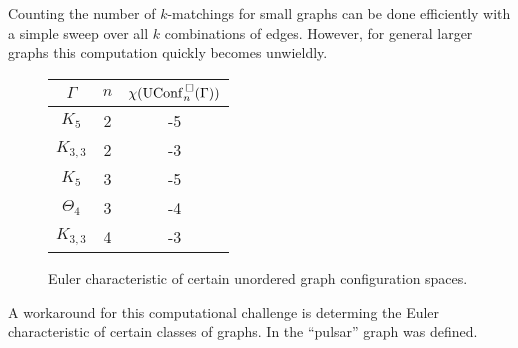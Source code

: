 Counting the number of \(k\)-matchings for small graphs can be done efficiently 
with a simple sweep over all \(k\) combinations of edges.
However, for general larger graphs this computation quickly becomes unwieldly.


\begin{figure}[h!]
\centering
\begin{tabular}{c | c | c}
   \(\Gamma\) & \(n\) & \(\chi(\mathrm{UConf}^{\,\square}_n(\Gamma))\) \\
   \hline
   \(K_5\) & 2 & -5 \\
   \(K_{3,3}\) & 2 & -3 \\
   \(K_5\) & 3 & -5 \\
   \(\Theta_4\) & 3 & -4 \\
   \(K_{3,3}\) & 4 & -3
\end{tabular}
\label{fig:euler_characteristics}
\caption{Euler characteristic of certain unordered graph configuration spaces.}
\end{figure}

A workaround for this computational challenge is determing the Euler characteristic of certain classes of graphs.
In \cite{appiah2024algebraicstructurehyperbolicgraph} the ``pulsar'' graph was defined.



